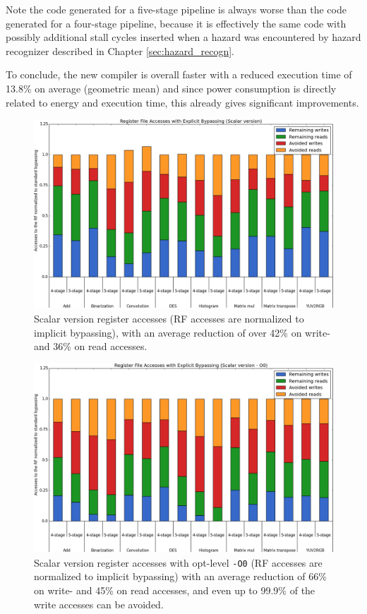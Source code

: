 Note the code generated for a five-stage pipeline is always worse than the code generated for a four-stage pipeline, because it is effectively the same code with possibly additional stall cycles inserted when a hazard was encountered by hazard recognizer described in Chapter \ref{sec:hazard_recogn}.

To conclude, the new compiler is overall faster with a reduced execution time of 13.8\% on average (geometric mean) and since power consumption is directly related to energy and execution time, this already gives significant improvements. 

\begin{figure}[t!]
\centering
\hspace*{-.12in}
\includegraphics[width=.875\textwidth]{figures/stats/scalar_accesses}
\caption{Scalar version register accesses (RF accesses are normalized to implicit bypassing), with an average reduction of over 42\% on write- and 36\% on read accesses.}
\label{fig:scalar_improvements}
\end{figure}


\begin{figure}[b!]
\centering
\hspace*{-.12in}
\includegraphics[width=.875\textwidth]{figures/stats/scalar_accesses_O0}
\caption{Scalar version register accesses with opt-level \texttt{-O0} (RF accesses are normalized to implicit bypassing) with an average reduction of 66\% on write- and 45\% on read accesses, and even up to 99.9\% of the write accesses can be avoided.}
\label{fig:scalar_improvements_O0}
\end{figure}

